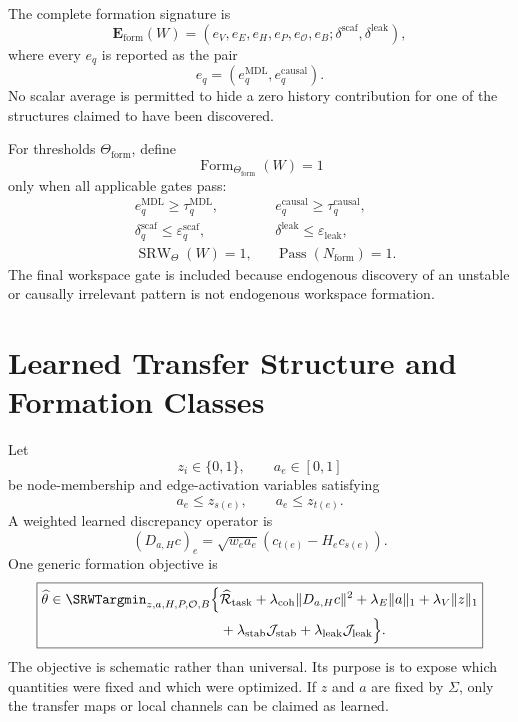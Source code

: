 The complete formation signature is
\[
\boxed{
\mathbf E_{\mathrm{form}}(W)
=
\left(
 e_V,e_E,e_H,e_P,e_{\mathcal O},e_B;
 \delta^{\mathrm{scaf}},
 \delta^{\mathrm{leak}}
\right),
}
\]
where every \(e_q\) is reported as the pair
\[
 e_q
=
\left(
 e_q^{\mathrm{MDL}},
 e_q^{\mathrm{causal}}
\right).
\]
No scalar average is permitted to hide a zero history contribution for one of
the structures claimed to have been discovered.


For thresholds \(\Theta_{\mathrm{form}}\), define
\[
\operatorname{Form}_{\Theta_{\mathrm{form}}}(W)=1
\]
only when all applicable gates pass:
\[
\begin{aligned}
& e_q^{\mathrm{MDL}}\geq \tau_q^{\mathrm{MDL}},
&& e_q^{\mathrm{causal}}\geq \tau_q^{\mathrm{causal}},\\
& \delta_q^{\mathrm{scaf}}\leq\varepsilon_q^{\mathrm{scaf}},
&& \delta^{\mathrm{leak}}\leq\varepsilon_{\mathrm{leak}},\\
& \operatorname{SRW}_{\Theta}(W)=1,
&& \operatorname{Pass}(N_{\mathrm{form}})=1.
\end{aligned}
\]
The final workspace gate is included because endogenous discovery of an
unstable or causally irrelevant pattern is not endogenous workspace formation.

\section{Learned Transfer Structure and Formation Classes}


Let
\[
z_i\in\{0,1\},
\qquad
a_e\in[0,1]
\]
be node-membership and edge-activation variables satisfying
\[
a_e\leq z_{s(e)},
\qquad
a_e\leq z_{t(e)}.
\]
A weighted learned discrepancy operator is
\[
(D_{a,H}c)_e
=
\sqrt{w_ea_e}
\left(
 c_{t(e)}-H_ec_{s(e)}
\right).
\]
One generic formation objective is
\[
\boxed{
\begin{aligned}
\widehat\theta
\in
\SRWTargmin_{z,a,H,P,\mathcal O,B}
\Bigl
\{&
\widehat{\mathcal R}_{\mathrm{task}}
+
\lambda_{\mathrm{coh}}\|D_{a,H}c\|^2
+
\lambda_E\|a\|_1
+
\lambda_V\|z\|_1\\
&+
\lambda_{\mathrm{stab}}\mathcal J_{\mathrm{stab}}
+
\lambda_{\mathrm{leak}}\mathcal J_{\mathrm{leak}}
\Bigr\}.
\end{aligned}
}
\]
The objective is schematic rather than universal. Its purpose is to expose
which quantities were fixed and which were optimized. If \(z\) and \(a\) are
fixed by \(\Sigma\), only the transfer maps or local channels can be claimed as
learned.

